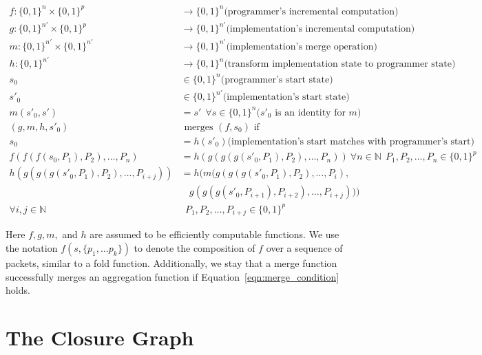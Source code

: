 \begin{align}
f : \{0, 1\}^n \times \{0, 1\}^p & \rightarrow \{0, 1\}^n \mbox{(programmer's incremental computation)} \nonumber \\
g : \{0, 1\}^{n'} \times \{0, 1\}^p  & \rightarrow \{0, 1\}^{n'} \mbox{(implementation's incremental computation)} \nonumber \\
m : \{0, 1\}^{n'} \times \{0, 1\}^{n'} & \rightarrow \{0, 1\}^{n'} \mbox{(implementation's merge operation)} \nonumber \\
h : \{0, 1\}^{n'}               & \rightarrow \{0, 1\}^n  \mbox{(transform
 implementation state to programmer state)} \nonumber \\
s_0  & \in \{0, 1\}^n \mbox{(programmer's start state)} \nonumber \\
s'_0 & \in \{0, 1\}^{n'} \mbox{(implementation's start state)} \nonumber \\
m(s'_0, s') & = s' \ \ \forall s \in \{0, 1\}^{n} \mbox{($s'_0$ is an identity for $m$)} \nonumber \\
(g, m, h, s'_0) & \mbox { merges } (f, s_0) \mbox{ if} \nonumber \\
s_0 & = h(s'_0) \mbox{(implementation's start matches with programmer's start)} \label{eqn:start_condition} \\
f(f(f(s_0, P_1), P_2), \dots, P_n) & = h(g(g(g(s'_0, P_1), P_2), \dots, P_n)) \ \forall n \in \mathbb{N} \ \ P_1, P_2, \dots, P_n \in \{0, 1\}^p \label{eqn:projection_condition} \\
h(g(g(g(s'_0, P_1), P_2), \dots, P_{i+j})) & =h( m(g(g(g(s'_0, P_1), P_2), \dots, P_{i}), \nonumber \\
&\ \ \ \ g(g(g(s'_0, P_{i+1}), P_{i+2}), \dots, P_{i+j}))) \nonumber \\
\forall i, j \in \mathbb{N} & \ \  P_1, P_2, \dots, P_{i+j} \in \{0, 1\}^p \label{eqn:merge_condition}
\end{align}

Here $f, g, m,$ and $h$ are assumed to be efficiently computable functions. We use the notation $f(s, \{p_1, \ldots p_k\})$ to denote the composition of $f$ over a sequence
of packets, similar to a fold function. Additionally, we stay that a merge function successfully merges an aggregation function if Equation~\ref{eqn:merge_condition} holds. 

\section{The Closure Graph}

